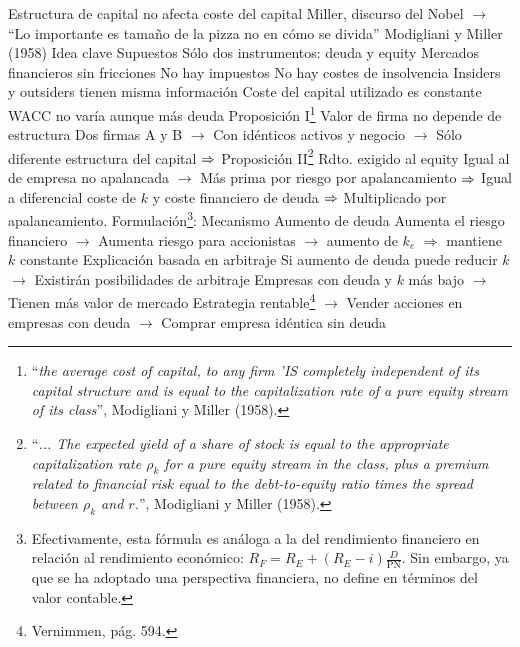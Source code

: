 \documentclass{nuevotema}
\begin{document}
\begin{esquemal}
				\4[] Estructura de capital no afecta coste del capital
				\4[] Miller, discurso del Nobel
				\4[] $\to$ ``Lo importante es tamaño de la pizza
				\4[] \quad no en cómo se divida''
		\2 Modigliani y Miller (1958)
			\3 Idea clave
				\4 Supuestos
				\4[] Sólo dos instrumentos: deuda y equity
				\4[] Mercados financieros sin fricciones
				\4[] No hay impuestos
				\4[] No hay costes de insolvencia
				\4[] Insiders y outsiders tienen misma información
				\4[$\then$] Coste del capital utilizado es constante
				\4[] WACC no varía aunque más deuda
			\3 Proposición I\footnote{ ``\textit{the average cost of capital, to any firm 'IS completely independent of its capital structure and is equal to the capitalization rate of a pure equity stream of its class}'', Modigliani y Miller (1958).}
				\4 Valor de firma no depende de estructura
				\4[] Dos firmas A y B
				\4[] $\to$ Con idénticos activos y negocio
				\4[] $\to$ Sólo diferente estructura del capital
				\4[] $\then$ 
			\3 Proposición II\footnote{ ``\textit{... The expected yield of a share of stock is equal to the appropriate capitalization rate $\rho_k$ for a pure equity stream in the class, plus a premium related to financial risk equal to the debt-to-equity ratio times the spread between $\rho_k$ and $r$.}'', Modigliani y Miller (1958).}
				\4 Rdto. exigido al equity
				\4[] Igual al de empresa no apalancada
				\4[] $\to$ Más prima por riesgo por apalancamiento
				\4[] $\then$ Igual a diferencial coste de $k$ y coste financiero de deuda
				\4[] $\then$ Multiplicado por apalancamiento.
				\4[] Formulación\footnote{Efectivamente, esta fórmula es análoga a la del rendimiento financiero en relación al rendimiento económico: $R_F = R_E + (R_E - i) \frac{D}{\text{PN}}$. Sin embargo, ya que se ha adoptado una perspectiva financiera, no define en términos del valor contable.}:
				\4[] 
			\3 Mecanismo
				\4 Aumento de deuda
				\4[] Aumenta el riesgo financiero
				\4[] $\to$ Aumenta riesgo para accionistas
				\4[] $\to$ aumento de $k_e$
				\4[] $\Rightarrow$ mantiene $k$ constante
				\4[] 
			\3 Explicación basada en arbitraje
				\4 Si aumento de deuda puede reducir $k$
				\4[] $\to$ Existirán posibilidades de arbitraje
				\4 Empresas con deuda y $k$ más bajo
				\4[] $\to$ Tienen más valor de mercado
				\4 Estrategia rentable\footnote{Vernimmen, pág. 594.}
				\4[] $\to$ Vender acciones en empresas con deuda
				\4[] $\to$ Comprar empresa idéntica sin deuda

\end{esquemal}
\end{document}
